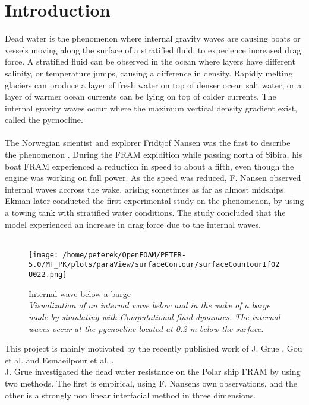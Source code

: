 \documentclass[a4paper, 12pt]{report}
\begin{document}
\chapter{Introduction}
Dead water is the phenomenon where internal gravity waves are causing boats or vessels moving along the surface of a stratified fluid, to experience increased drag force. A stratified fluid can be observed in the ocean where layers have different salinity, or temperature jumps, causing a difference in density. Rapidly melting glaciers can produce a layer of fresh water on top of denser ocean salt water, or a layer of warmer ocean currents can be lying on top of colder currents. The internal gravity waves occur where the maximum vertical density gradient exist, called the pycnocline.\\
\\
The Norwegian scientist and explorer Fridtjof Nansen was the first to describe the phenomenon \citep{Nansen}. During the FRAM expidition while passing north of Sibira, his boat FRAM experienced a reduction in speed to about a fifth, even though the engine was working on full power. As the speed was reduced, F. Nansen observed internal waves accross the wake, arising sometimes as far as almost midships. Ekman later conducted the first experimental study on the phenomenon\cite{Ekman}, by using a towing tank with stratified water conditions. The study concluded that the model experienced an increase in drag force due to the internal waves.\\
\\
\begin{figure}[H]
	\centering
	\texttt{[image: /home/peterek/OpenFOAM/PETER-5.0/MT\_PK/plots/paraView/surfaceContour/surfaceCountourIf02U022.png]}
	\caption{Internal wave below a barge\\ \textit{Visualization of an internal wave below and in the wake of a barge made by simulating with Computational fluid dynamics. The internal waves occur at the pycnocline located at 0.2 m below the surface.}}
	\label{fig:eta0}
\end{figure}
This project is mainly motivated by the recently published work of J. Grue \cite{Grue}, Gou et al. \cite{Gou} and Esmaeilpour et al. \cite{Esmaeilpour}.\\
J. Grue investigated the dead water resistance on the Polar ship FRAM by using two methods. The first is empirical, using F. Nansens own observations, and the other is a strongly non linear interfacial method in three dimensions.\\
\end{document}
